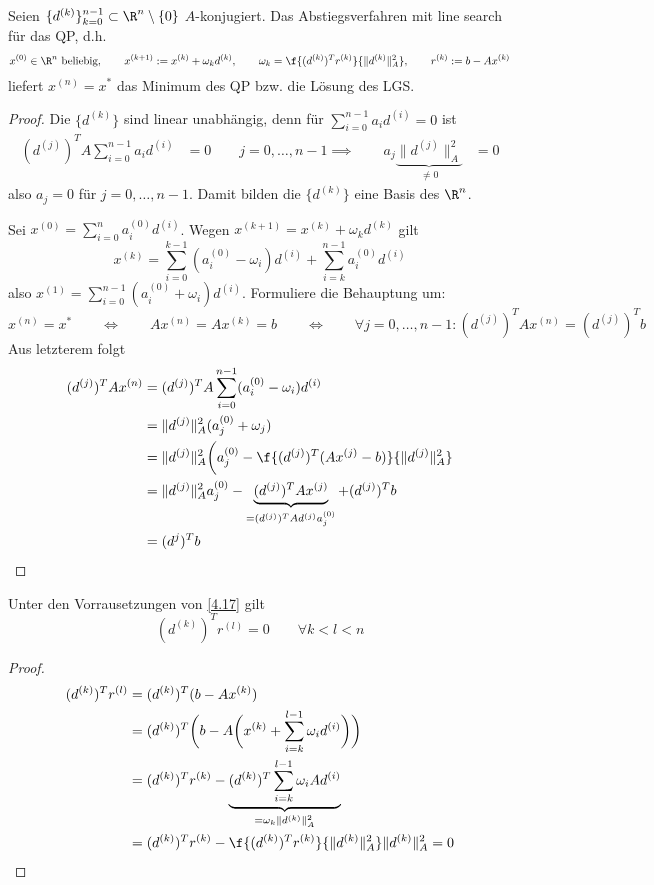 \documentclass[11pt]{scrartcl}
\begin{document}
\begin{st}[Konvergenz] \label{4.17}
	Seien $\{d^{(k)}\}_{k=0}^{n-1} \subset \R^n \setminus \{0\}$ $A$-konjugiert.
	Das Abstiegsverfahren mit line search für das QP, d.h.
	\[
		x^{(0)} \in \R^n \text{ beliebig},
		\qquad x^{(k+1)} := x^{(k)} + \omega_k d^{(k)},
		\qquad \omega_k = \f{(d^{(k)})^T r^{(k)}}{\|d^{(k)}\|_A^2},
		\qquad r^{(k)} := b - Ax^{(k)}
	\]
	liefert $x^{(n)} = x^*$ das Minimum des QP bzw. die Lösung des LGS.
	\begin{proof}
		Die $\{d^{(k)}\}$ sind linear unabhängig, denn für $\sum_{i=0}^{n-1} a_i d^{(i)} = 0$ ist
		\begin{align*}
			(d^{(j)})^T A \sum_{i=0}^{n-1} a_i d^{(i)} &= 0  \qquad j= 0, \dotsc, n-1
			\implies \qquad a_j \underbrace{\|d^{(j)}\|_A^2}_{\neq 0} &= 0 
		\end{align*}
		also $a_j = 0$ für $j=0,\dotsc,n-1$.
		Damit bilden die $\{d^{(k)}\}$ eine Basis des $\R^n$.

		Sei $x^{(0)} = \sum_{i=0}^n a_i^{(0)} d^{(i)}$.
		Wegen $x^{(k+1)} = x^{(k)} + \omega_k d^{(k)}$ gilt
		\[
			x^{(k)} = \sum_{i=0}^{k-1} (a_i^{(0)} - \omega_i)d^{(i)} + \sum_{i=k}^{n-1} a_i^{(0)} d^{(i)}
		\]
		also $x^{(1)} = \sum_{i=0}^{n-1} (a_i^{(0)}+\omega_i) d^{(i)}$.
		Formuliere die Behauptung um:
		\[
			x^{(n)} = x^* \qquad \iff \qquad Ax^{(n)} = A x^{(k)} = b
			\qquad \iff \qquad \forall j=0,\dotsc,n-1 : (d^{(j)})^T A x^{(n)} = (d^{(j)})^T b
		\]
		Aus letzterem folgt
		\begin{align*}
			(d^{(j)})^T A x^{(n)} 
			&= (d^{(j)})^T A \sum_{i=0}^{n-1} (a_i^{(0)}-\omega_i) d^{(i)} \\
			&= \|d^{(j)}\|_A^2 (a_j^{(0)}+\omega_j) \\
			&= \|d^{(j)}\|_A^2 \bigg( a_j^{(0)} - \f{(d^{(j)})^T (Ax^{(j)}-b)}{\|d^{(j)}\|_A^2} \\
			&= \|d^{(j)}\|_A^2 a_j^{(0)} - \underbrace{(d^{(j)})^T Ax^{(j)}}_{= (d^{(j)})^T A d^{(j)}a_j^{(0)}} + (d^{(j)})^T b \\
			&= (d^{j})^T b
		\end{align*}
	\end{proof}
\end{st}

\begin{lem}[Orthogonalität] \label{4.18}
	Unter den Vorrausetzungen von \ref{4.17} gilt
	\[
		(d^{(k)})^T r^{(l)} = 0
		\qquad \forall k < l < n
	\]
	\begin{proof}
		\begin{align*}
			(d^{(k)})^T r^{(l)}
			&= (d^{(k)})^T (b-Ax^{(k)}) \\
			&= (d^{(k)})^T \bigg( b - A \bigg(x^{(k)} + \sum_{i=k}^{l-1} \omega_i d^{(i)} \bigg) \bigg) \\
			&= (d^{(k)})^T r^{(k)} - \underbrace{(d^{(k)})^T \sum_{i=k}^{l-1} \omega_i A d^{(i)}}_{= \omega_k \|d^{(k)}\|_A^2} \\
			&= (d^{(k)})^T r^{(k)} - \f{(d^{(k)})^T r^{(k)}}{\|d^{(k)}\|_A^2} \|d^{(k)}\|_A^2 = 0
		\end{align*}
	\end{proof}
\end{lem}
\end{document}
